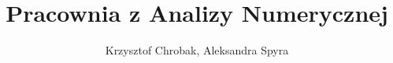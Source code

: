 \documentclass[12pt,oneside]{article}
\numberwithin{figure}{section}
\numberwithin{table}{section}
\begin{document}
\title{Pracownia z Analizy Numerycznej}
\author{Krzysztof Chrobak, Aleksandra Spyra}
\maketitle






\end{document}

